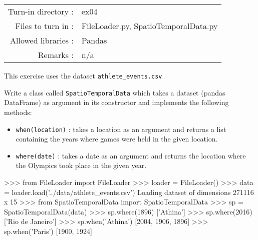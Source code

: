\documentclass[]{article}
\newenvironment{Shaded}{\begin{snugshade}}{\end{snugshade}}
\newcommand{\DecValTok}[1]{\textcolor[rgb]{0.96,0.45,0.00}{#1}}
\newcommand{\ImportTok}[1]{\textcolor[rgb]{0.15,0.68,0.38}{#1}}
\newcommand{\NormalTok}[1]{\textcolor[rgb]{0.81,0.81,0.76}{#1}}
\newcommand{\OperatorTok}[1]{\textcolor[rgb]{0.81,0.81,0.76}{#1}}
\newcommand{\StringTok}[1]{\textcolor[rgb]{0.96,0.31,0.31}{#1}}
\begin{document}
\begin{longtable}[]{@{}rl@{}}
\toprule
\endhead
Turn-in directory : & ex04\tabularnewline
Files to turn in : & FileLoader.py, SpatioTemporalData.py\tabularnewline
Allowed libraries : & Pandas\tabularnewline
Remarks : & n/a\tabularnewline
\bottomrule
\end{longtable}

This exercise uses the dataset \texttt{athlete\_events.csv}

Write a class called \texttt{SpatioTemporalData} which takes a dataset
(pandas DataFrame) as argument in its constructor and implements the
following methods:

\begin{itemize}
\item
  \texttt{when(location)} : takes a location as an argument and returns
  a list containing the years where games were held in the given
  location.
\item
  \texttt{where(date)} : takes a date as an argument and returns the
  location where the Olympics took place in the given year.
\end{itemize}

\begin{Shaded}
\begin{Highlighting}[]
\OperatorTok{>>>} \ImportTok{from}\NormalTok{ FileLoader }\ImportTok{import}\NormalTok{ FileLoader}
\OperatorTok{>>>}\NormalTok{ loader }\OperatorTok{=}\NormalTok{ FileLoader()}
\OperatorTok{>>>}\NormalTok{ data }\OperatorTok{=}\NormalTok{ loader.load(}\StringTok{'../data/athlete_events.csv'}\NormalTok{)}
\NormalTok{Loading dataset of dimensions }\DecValTok{271116}\NormalTok{ x }\DecValTok{15}
\OperatorTok{>>>} \ImportTok{from}\NormalTok{ SpatioTemporalData }\ImportTok{import}\NormalTok{ SpatioTemporalData}
\OperatorTok{>>>}\NormalTok{ sp }\OperatorTok{=}\NormalTok{ SpatioTemporalData(data)}
\OperatorTok{>>>}\NormalTok{ sp.where(}\DecValTok{1896}\NormalTok{)}
\NormalTok{[}\StringTok{'Athina'}\NormalTok{]}
\OperatorTok{>>>}\NormalTok{ sp.where(}\DecValTok{2016}\NormalTok{)}
\NormalTok{[}\StringTok{'Rio de Janeiro'}\NormalTok{]}
\OperatorTok{>>>}\NormalTok{ sp.when(}\StringTok{'Athina'}\NormalTok{)}
\NormalTok{[}\DecValTok{2004}\NormalTok{, }\DecValTok{1906}\NormalTok{, }\DecValTok{1896}\NormalTok{]}
\OperatorTok{>>>}\NormalTok{ sp.when(}\StringTok{'Paris'}\NormalTok{)}
\NormalTok{[}\DecValTok{1900}\NormalTok{, }\DecValTok{1924}\NormalTok{]}
\end{Highlighting}
\end{Shaded}
\end{document}
